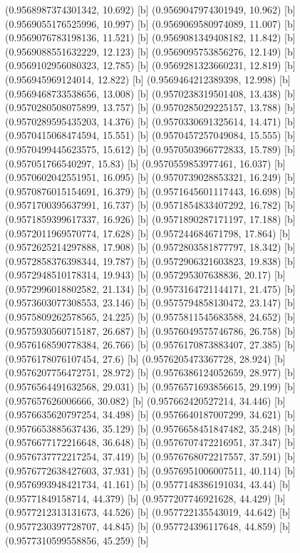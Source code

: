 {{{(0.9568987374301342, 10.692) [b] 
(0.9569047974301949, 10.962) [b] 
(0.9569055176525996, 10.997) [b] 
(0.9569069580974089, 11.007) [b] 
(0.9569076783198136, 11.521) [b] 
(0.9569081349408182, 11.842) [b] 
(0.9569088551632229, 12.123) [b] 
(0.9569095753856276, 12.149) [b] 
(0.9569102956080323, 12.785) [b] 
(0.9569281323660231, 12.819) [b] 
(0.956945969124014, 12.822) [b] 
(0.9569464212389398, 12.998) [b] 
(0.9569468733538656, 13.008) [b] 
(0.9570238319501408, 13.438) [b] 
(0.9570280508075899, 13.757) [b] 
(0.9570285029225157, 13.788) [b] 
(0.9570289595435203, 14.376) [b] 
(0.9570330691325614, 14.471) [b] 
(0.9570415068474594, 15.551) [b] 
(0.9570457257049084, 15.555) [b] 
(0.9570499445623575, 15.612) [b] 
(0.9570503966772833, 15.789) [b] 
(0.957051766540297, 15.83) [b] 
(0.9570559853977461, 16.037) [b] 
(0.9570602042551951, 16.095) [b] 
(0.9570739028853321, 16.249) [b] 
(0.9570876015154691, 16.379) [b] 
(0.9571645601117443, 16.698) [b] 
(0.9571700395637991, 16.737) [b] 
(0.9571854833407292, 16.782) [b] 
(0.9571859399617337, 16.926) [b] 
(0.9571890287171197, 17.188) [b] 
(0.9572011969570774, 17.628) [b] 
(0.957244684671798, 17.864) [b] 
(0.9572625214297888, 17.908) [b] 
(0.9572803581877797, 18.342) [b] 
(0.9572858376398344, 19.787) [b] 
(0.9572906321603823, 19.838) [b] 
(0.9572948510178314, 19.943) [b] 
(0.957295307638836, 20.17) [b] 
(0.9572996018802582, 21.134) [b] 
(0.9573164721144171, 21.475) [b] 
(0.9573603077308553, 23.146) [b] 
(0.9575794858130472, 23.147) [b] 
(0.9575809262578565, 24.225) [b] 
(0.9575811545683588, 24.652) [b] 
(0.9575930560715187, 26.687) [b] 
(0.9576049575746786, 26.758) [b] 
(0.9576168590778384, 26.766) [b] 
(0.9576170873883407, 27.385) [b] 
(0.9576178076107454, 27.6) [b] 
(0.9576205473367728, 28.924) [b] 
(0.9576207756472751, 28.972) [b] 
(0.9576386124052659, 28.977) [b] 
(0.9576564491632568, 29.031) [b] 
(0.9576571693856615, 29.199) [b] 
(0.957657626006666, 30.082) [b] 
(0.957662420527214, 34.446) [b] 
(0.9576635620797254, 34.498) [b] 
(0.9576640187007299, 34.621) [b] 
(0.9576653885637436, 35.129) [b] 
(0.9576658451847482, 35.248) [b] 
(0.9576677172216648, 36.648) [b] 
(0.9576707472216951, 37.347) [b] 
(0.9576737772217254, 37.419) [b] 
(0.9576768072217557, 37.591) [b] 
(0.9576772638427603, 37.931) [b] 
(0.9576951006007511, 40.114) [b] 
(0.9576993948421734, 41.161) [b] 
(0.9577148386191034, 43.44) [b] 
(0.95771849158714, 44.379) [b] 
(0.9577207746921628, 44.429) [b] 
(0.9577212313131673, 44.526) [b] 
(0.957722135543019, 44.642) [b] 
(0.9577230397728707, 44.845) [b] 
(0.957724396117648, 44.859) [b] 
(0.9577310599558856, 45.259) [b] 
}}}

